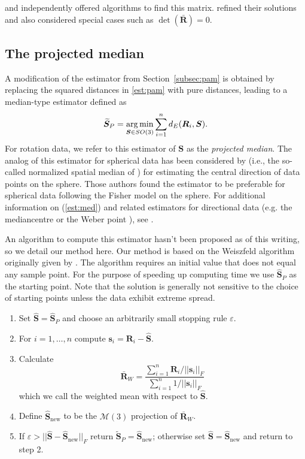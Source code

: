  \citet{arun87} and \citet{horn88} independently offered algorithms to find this matrix.  \citet{umeyama91} refined their solutions and also considered special cases such as $\det(\bar{\bm R})=0$.

\subsection{The projected median}
\label{subsec:med}

A modification of the estimator from Section~\ref{subsec:pam} is obtained by replacing the squared distances in \eqref{est:pam} with pure distances, leading to a median-type estimator defined as
\begin{equation}\label{est:med}
\widetilde{\bm{S}}_P=\operatorname*{arg\,min}_{\bm{S}\in
SO(3)}\sum_{i=1}^nd_E(\bm{R}_i,\bm{S}).
\end{equation}
For rotation data, we refer to this estimator of $\bm{S}$ as the \textit{projected median}.  
The analog of this estimator for spherical data has been considered by \citet{chan93} (i.e., the so-called normalized spatial median of \cite{ducharme87}) for estimating the central direction of data points on the sphere.   Those authors found the estimator to be preferable for spherical data following the Fisher model on the sphere. For additional information on (\ref{est:med}) and related estimators for directional data (e.g. the mediancentre \citep{gower74} or the Weber point \citep{bajaj88}),  see \citet{durocher09}. 

An algorithm to compute this estimator hasn't been proposed as of this writing, so we detail our method here.  Our method is based on the Weiszfeld algorithm originally given by \cite{weiszfeld37}.  The algorithm requires an initial value that does not equal any sample point. For the purpose of speeding up computing time we use $\widehat{\bm S}_P$ as the starting point. Note that the solution is generally not sensitive to the choice of starting points unless the data exhibit extreme spread.
\begin{enumerate}
\item Set $\widehat{\bm S}=\widehat{\bm S}_{P}$ and choose an arbitrarily small stopping rule $\varepsilon$.
\item For $i=1,\ldots,n$ compute $\bm s_i=\bm R_i-\widehat{\bm S}$.
\item Calculate
\[
\bar{\bm R}_W=\frac{\sum_{i=1}^n\bm R_i/||\bm s_i||_F}{\sum_{i=1}^n1/||\bm s_i||_F}
\]
which we call the weighted mean with respect to $\widehat{\bm S}$.
\item Define $\widehat{\bm S}_{\text{new}}$ to be the $\mathcal{M}(3)$ projection of $\bar{\bm R}_W$.
\item If $\varepsilon>||\widehat{\bm S}-\widehat{\bm S}_{\text{new}}||_F$ return $\widetilde{\bm{S}}_P=\widehat{\bm S}_{\text{new}}$; otherwise set $\widehat{\bm S}=\widehat{\bm S}_{\text{new}}$ and return to step 2.
\end{enumerate}

